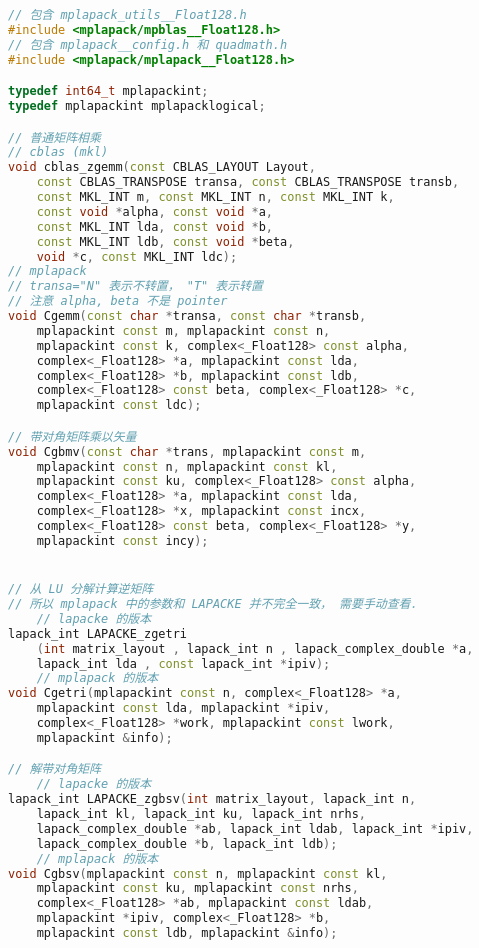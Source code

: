 \begin{lstlisting}[language=cpp]
// 包含 mplapack_utils__Float128.h
#include <mplapack/mpblas__Float128.h>
// 包含 mplapack__config.h 和 quadmath.h
#include <mplapack/mplapack__Float128.h>

typedef int64_t mplapackint;
typedef mplapackint mplapacklogical;

// 普通矩阵相乘
// cblas (mkl)
void cblas_zgemm(const CBLAS_LAYOUT Layout,
    const CBLAS_TRANSPOSE transa, const CBLAS_TRANSPOSE transb,
    const MKL_INT m, const MKL_INT n, const MKL_INT k,
    const void *alpha, const void *a,
    const MKL_INT lda, const void *b,
    const MKL_INT ldb, const void *beta,
    void *c, const MKL_INT ldc);
// mplapack
// transa="N" 表示不转置， "T" 表示转置
// 注意 alpha, beta 不是 pointer
void Cgemm(const char *transa, const char *transb,
    mplapackint const m, mplapackint const n,
    mplapackint const k, complex<_Float128> const alpha,
    complex<_Float128> *a, mplapackint const lda,
    complex<_Float128> *b, mplapackint const ldb,
    complex<_Float128> const beta, complex<_Float128> *c,
    mplapackint const ldc);

// 带对角矩阵乘以矢量
void Cgbmv(const char *trans, mplapackint const m,
    mplapackint const n, mplapackint const kl,
    mplapackint const ku, complex<_Float128> const alpha,
    complex<_Float128> *a, mplapackint const lda,
    complex<_Float128> *x, mplapackint const incx,
    complex<_Float128> const beta, complex<_Float128> *y,
    mplapackint const incy);


// 从 LU 分解计算逆矩阵
// 所以 mplapack 中的参数和 LAPACKE 并不完全一致， 需要手动查看．
    // lapacke 的版本
lapack_int LAPACKE_zgetri
    (int matrix_layout , lapack_int n , lapack_complex_double *a,
    lapack_int lda , const lapack_int *ipiv);
    // mplapack 的版本
void Cgetri(mplapackint const n, complex<_Float128> *a,
    mplapackint const lda, mplapackint *ipiv,
    complex<_Float128> *work, mplapackint const lwork,
    mplapackint &info);

// 解带对角矩阵
    // lapacke 的版本
lapack_int LAPACKE_zgbsv(int matrix_layout, lapack_int n,
    lapack_int kl, lapack_int ku, lapack_int nrhs,
    lapack_complex_double *ab, lapack_int ldab, lapack_int *ipiv,
    lapack_complex_double *b, lapack_int ldb);
    // mplapack 的版本
void Cgbsv(mplapackint const n, mplapackint const kl,
    mplapackint const ku, mplapackint const nrhs,
    complex<_Float128> *ab, mplapackint const ldab,
    mplapackint *ipiv, complex<_Float128> *b,
    mplapackint const ldb, mplapackint &info);
\end{lstlisting}
